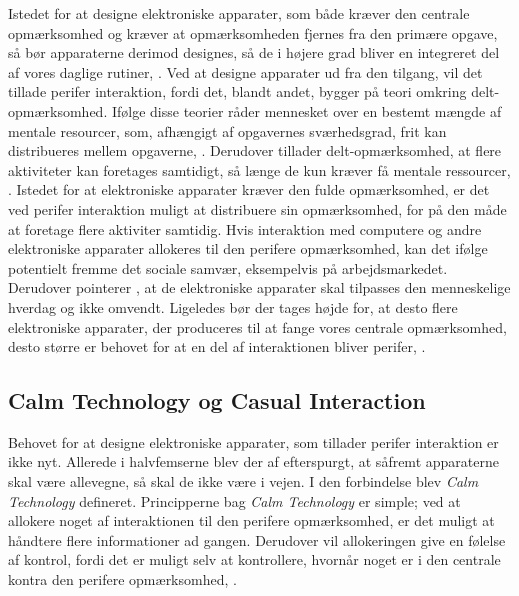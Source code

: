 Istedet for at designe elektroniske apparater, som både kræver den centrale opmærksomhed og kræver at opmærksomheden fjernes fra den primære opgave, så bør apparaterne derimod designes, så de i højere grad bliver en integreret del af vores daglige rutiner, \parencite[s. 239]{PDF:PICharacteristicsAndConsiderations}. Ved at designe apparater ud fra den tilgang, vil det tillade perifer interaktion, fordi det, blandt andet, bygger på teori omkring delt-opmærksomhed. Ifølge disse teorier råder mennesket over en bestemt mængde af mentale resourcer, som, afhængigt af opgavernes sværhedsgrad, frit kan distribueres mellem opgaverne, \parencite[s. 240]{PDF:PICharacteristicsAndConsiderations}. Derudover tillader delt-opmærksomhed, at flere aktiviteter kan foretages samtidigt, så længe de kun kræver få mentale ressourcer, \parencite[s. 2]{PDF:FacilitatingPIDesignAndEvaluation}. Istedet for at elektroniske apparater kræver den fulde opmærksomhed, er det ved perifer interaktion muligt at distribuere sin opmærksomhed, for på den måde at foretage flere aktiviter samtidig. Hvis interaktion med computere og andre elektroniske apparater allokeres til den perifere opmærksomhed, kan det ifølge \textcite[s. 11]{PDF:TheComputerWeiser} potentielt fremme det sociale samvær, eksempelvis på arbejdsmarkedet. Derudover pointerer \textcite[s. 11]{PDF:TheComputerWeiser}, at de elektroniske apparater skal tilpasses den menneskelige hverdag og ikke omvendt. Ligeledes bør der tages højde for, at desto flere elektroniske apparater, der produceres til at fange vores centrale opmærksomhed, desto større er behovet for at en del af interaktionen bliver perifer, \parencite[s. 240]{PDF:PICharacteristicsAndConsiderations}.
\newpage
%
\subsection{Calm Technology og Casual Interaction}
\label{CasualOgCalm}
%
Behovet for at designe elektroniske apparater, som tillader perifer interaktion er ikke nyt. Allerede i halvfemserne blev der af \textcite[s. 3]{PDF:TheComingAgeOfCalmTech} efterspurgt, at såfremt apparaterne skal være allevegne, så skal de ikke være i vejen. I den forbindelse blev \textit{Calm Technology} defineret. Principperne bag \textit{Calm Technology} er simple; ved at allokere noget af interaktionen til den perifere opmærksomhed, er det muligt at håndtere flere informationer ad gangen. Derudover vil allokeringen give en følelse af kontrol, fordi det er muligt selv at kontrollere, hvornår noget er i den centrale kontra den perifere opmærksomhed, \parencite[s. 4]{PDF:TheComingAgeOfCalmTech}. 

